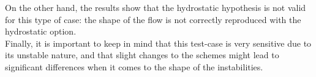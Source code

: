 On the other hand, the results show that the hydrostatic hypothesis is not valid for this type of case:
the shape of the flow is not correctly reproduced with the hydrostatic option.\\

Finally, it is important to keep in mind that this test-case is
very sensitive due to its unstable nature, and that slight changes to the schemes
might lead to significant differences when it comes to the shape of the instabilities.


